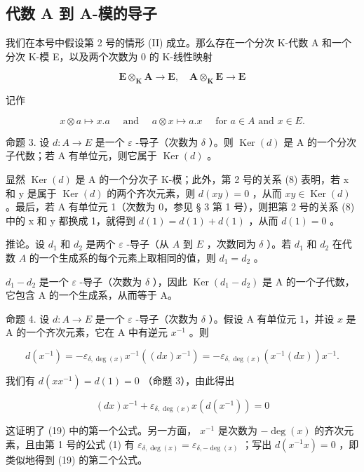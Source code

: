 \subsection{代数 A 到 A-模的导子}

我们在本号中假设第 2 号的情形 (II) 成立。那么存在一个分次 K-代数 A 和一个分次 K-模 E，以及两个次数为 0 的 K-线性映射

\[
\mathbf {E} \otimes_ {\mathbf {K}} \mathbf {A} \rightarrow \mathbf {E}, \quad \mathbf {A} \otimes_ {\mathbf {K}} \mathbf {E} \rightarrow \mathbf {E}
\]

记作

\[
x \otimes a \mapsto x. a \quad \text { and } \quad a \otimes x \mapsto a. x \quad \text { for   } a \in A \text {   and   } x \in E.
\]

命题 3. 设 \(d:A\to E\) 是一个 \(\varepsilon\) -导子（次数为 \(\delta\) ）。则 \(\operatorname{Ker}(d)\) 是 A 的一个分次子代数；若 A 有单位元，则它属于 \(\operatorname{Ker}(d)\) 。

显然 \(\operatorname{Ker}(d)\) 是 A 的一个分次子 K-模；此外，第 2 号的关系 (8) 表明，若 x 和 y 是属于 \(\operatorname{Ker}(d)\) 的两个齐次元素，则 \(d(xy) = 0\) ，从而 \(xy \in \operatorname{Ker}(d)\) 。最后，若 A 有单位元 1（次数为 0，参见 § 3 第 1 号），则把第 2 号的关系 (8) 中的 x 和 y 都换成 1，就得到 \(d(1) = d(1) + d(1)\) ，从而 \(d(1) = 0\) 。

推论。设 \(d_1\) 和 \(d_2\) 是两个 \(\varepsilon\) -导子（从 \(A\) 到 \(E\) ，次数同为 \(\delta\) ）。若 \(d_1\) 和 \(d_2\) 在代数 \(A\) 的一个生成系的每个元素上取相同的值，则 \(d_1 = d_2\) 。

\(d_{1} - d_{2}\) 是一个 \(\varepsilon\) -导子（次数为 \(\delta\) ），因此 \(\operatorname{Ker}(d_1 - d_2)\) 是 A 的一个子代数，它包含 A 的一个生成系，从而等于 A。

命题 4. 设 \(d:A\to E\) 是一个 \(\varepsilon\) -导子（次数为 \(\delta\) ）。假设 A 有单位元 1，并设 \(x\) 是 A 的一个齐次元素，它在 A 中有逆元 \(x^{-1}\) 。则

\[
d (x ^ {- 1}) = - \varepsilon_ {\delta , \deg (x)} x ^ {- 1} ((d x) x ^ {- 1}) = - \varepsilon_ {\delta , \deg (x)} (x ^ {- 1} (d x)) x ^ {- 1}.\tag{19}
\]

我们有 \(d(xx^{-1}) = d(1) = 0\) （命题 3），由此得出

\[
(d x) x ^ {- 1} + \varepsilon_ {\delta , \deg (x)} x (d (x ^ {- 1})) = 0
\]

这证明了 (19) 中的第一个公式。另一方面， \(x^{-1}\) 是次数为 \(-\deg(x)\) 的齐次元素，且由第 1 号的公式 (1) 有 \(\varepsilon_{\delta,\deg(x)} = \varepsilon_{\delta,-\deg(x)}\) ；写出 \(d(x^{-1}x) = 0\) ，即类似地得到 (19) 的第二个公式。

